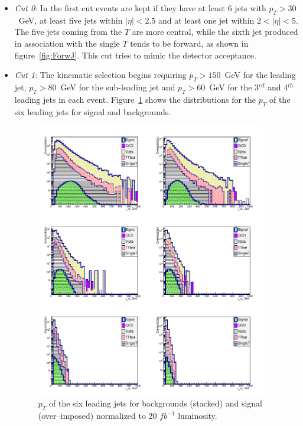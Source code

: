 \begin{itemize}

\item \textit{Cut 0}: In the first cut events are kept if they have at least 6 jets with $p_T > 30$~GeV, at least five jets within $|\eta|<2.5$ and at least one jet within $2<|\eta|<5$. The five jets coming from the $T$ are more central, while the sixth jet produced in association with the single $T$ tends to be forward, as shown in figure~\ref{fig:ForwJ}. This cut tries to mimic the detector acceptance.

\item \textit{Cut 1}: The kinematic selection begins requiring $p_{T}>150$~GeV for the leading jet, $p_{T}>80$~GeV for the sub-leading jet and $p_{T}>60$~GeV for the 3$^{rd}$ and 4$^{th}$ leading jets in each event. Figure~\ref{fig:Var1} shows the distributions for the $p_{T}$ of the six leading jets for signal and backgrounds.

\begin{figure}[!Hhtbp]
  \begin{center}
    \includegraphics[width=0.95\textwidth]{figs/Pheno/JetPt.png}
    \caption{$p_{T}$  of the six leading jets for backgrounds (stacked) and signal (over--imposed) normalized to 20 $fb^{-1}$ luminosity.}
    \label{fig:Var1}
  \end{center}
\end{figure}


\end{itemize}
